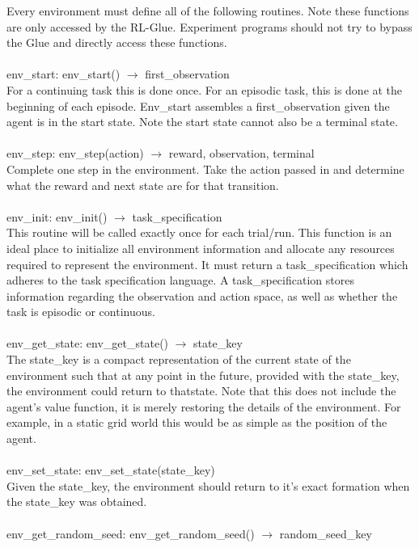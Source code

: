 \documentclass[11pt]{article}
\begin{document}
Every environment must define all of the following routines. Note these functions are only accessed by the RL-Glue. Experiment programs should not try to bypass the Glue and directly access these functions.
\\\\
env\_start: env\_start() $\rightarrow$ first\_observation\\
For a continuing task this is done once. For an episodic task, this is done at the beginning of each episode. Env\_start assembles a first\_observation given the agent is in the start state. Note the start state cannot also be a terminal state.
\\\\
env\_step: env\_step(action) $\rightarrow$ reward, observation, terminal\\
Complete one step in the environment. Take the action passed in and determine what the reward and next state are for that transition.
\\\\
env\_init: env\_init() $\rightarrow$ task\_specification\\
This routine will be called exactly once for each trial/run. This function is an ideal place to initialize all environment information and allocate any resources required to represent the environment. It must return a task\_specification which adheres to the task specification language. A task\_specification stores information regarding the observation and action space, as well as whether the task is episodic or continuous.
\\\\   
env\_get\_state: env\_get\_state() $\rightarrow$ state\_key\\
The state\_key is a compact representation of the current state of the environment such that at any point in the future, provided with the state\_key, the environment could return to thatstate. Note that this does not include the agent's value function, it is merely restoring the details of the environment. For example, in a static grid world this would be as simple as the position of the agent.
\\\\
env\_set\_state: env\_set\_state(state\_key)\\
Given the state\_key, the environment should return to it's exact formation when the state\_key was obtained. 
\\\\
env\_get\_random\_seed: env\_get\_random\_seed() $\rightarrow$ random\_seed\_key\\
\end{document}

